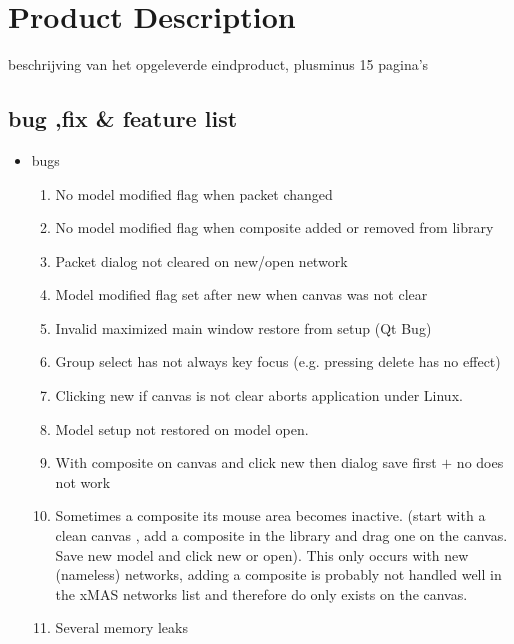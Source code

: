 \section{Product Description}

beschrijving van het opgeleverde eindproduct, plusminus 15 pagina’s

\subsection{bug ,fix \& feature list}
\begin{itemize}
\item	bugs
\begin{enumerate}
\item	No model modified flag when packet changed
\item	No model modified flag when composite added or removed from library 
\item	Packet dialog not cleared on new/open network
\item	Model modified flag set after new when canvas was not clear
\item	Invalid maximized main window restore from setup (Qt Bug)
\item	Group select has not always key focus (e.g. pressing delete has no effect)
\item	Clicking new if canvas is not clear aborts application under Linux.
\item	Model setup not restored on model open.
\item With composite on canvas and click new then dialog save first $+$ no does not
work
\item Sometimes a composite its mouse area becomes inactive. (start with a clean
canvas , add a composite in the library and drag one on the canvas. Save new
model and click new or open). This only occurs with new (nameless) networks,
adding a composite is probably not handled well in the xMAS networks list and
therefore do only exists on the canvas.
\item	Several memory leaks
\end{enumerate}


\end{itemize}
